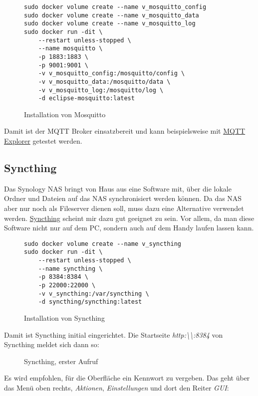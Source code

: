 \documentclass[12pt,a4paper]{article}
\newcommand{\code}[1]{\textit{#1}}
\newcommand{\jpaimg}[2]{\begin{figure}[H]\centering\fbox{\texttt{[image: \#1]}}\caption{#2}\label{fig:#2}\end{figure}}
\begin{document}
\begin{figure}[H]
\begin{lstlisting}
sudo docker volume create --name v_mosquitto_config
sudo docker volume create --name v_mosquitto_data
sudo docker volume create --name v_mosquitto_log
sudo docker run -dit \
    --restart unless-stopped \
    --name mosquitto \
    -p 1883:1883 \
    -p 9001:9001 \
    -v v_mosquitto_config:/mosquitto/config \
    -v v_mosquitto_data:/mosquitto/data \
    -v v_mosquitto_log:/mosquitto/log \
    -d eclipse-mosquitto:latest
\end{lstlisting}
\caption{Installation von Mosquitto}\label{fig:Installation von Mosquitto}
\end{figure}

Damit ist der MQTT Broker einsatzbereit und kann beispielsweise mit \href{http://mqtt-explorer.com/}{MQTT Explorer}
getestet werden.

\subsection{Syncthing}
Das Synology NAS bringt von Haus aus eine Software mit, über die lokale Ordner und Dateien auf das NAS synchronisiert
werden können. Da das NAS aber nur noch als Fileserver dienen soll, muss dazu eine Alternative verwendet werden.
\href{https://syncthing.net/}{Syncthing} scheint mir dazu gut geeignet zu sein. Vor allem, da man diese Software nicht
nur auf dem PC, sondern auch auf dem Handy laufen lassen kann.

\begin{figure}[H]
\begin{lstlisting}
sudo docker volume create --name v_syncthing
sudo docker run -dit \
    --restart unless-stopped \
    --name syncthing \
    -p 8384:8384 \
    -p 22000:22000 \
    -v v_syncthing:/var/syncthing \
    -d syncthing/syncthing:latest
\end{lstlisting}
\caption{Installation von Syncthing}\label{fig:Installation von Syncthing}
\end{figure}

Damit ist Syncthing initial eingerichtet. Die Startseite \code{http:\textbackslash\textbackslash<IP OF SERVER>:8384} von
Syncthing meldet sich dann so:

\jpaimg{./images/Syncthing-01.png}{Syncthing, erster Aufruf}

Es wird empfohlen, für die Oberfläche ein Kennwort zu vergeben. Das geht über das Menü oben rechts, \code{Aktionen},
\code{Einstellungen} und dort den Reiter \code{GUI}:
\end{document}
